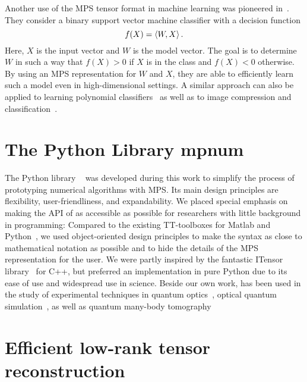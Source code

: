 Another use of the MPS tensor format in machine learning was pioneered in~\cite{Stoudenmire_2016_Supervised}.
They consider a binary support vector machine classifier with a decision function
\[
  f(X) = \braket{W, X}.
\]
Here, $X$ is the input vector and $W$ is the model vector.
The goal is to determine $W$ in such a way that $f(X) > 0$ if $X$ is in the  class and $f(X) < 0$ otherwise.
By using an MPS representation for $W$ and $X$, they are able to efficiently learn such a model even in high-dimensional settings.
A similar approach can also be applied to learning polynomial classifiers~\cite{Chen_2017_Parallelized} as well as to image compression and classification~\cite{Bengua_2015_Optimal,Bengua_2016_Matrix}.



\section{The Python Library mpnum}%
\label{sec:tensors.mpnum}

The Python library \mpnum~\cite{Suess_2017_Mpnum} was developed during this work to simplify the process of prototyping numerical algorithms with MPS.
Its main design principles are flexibility, user-friendliness, and expandability.
We placed special emphasis on making the API of \mpnum{} as accessible as possible for researchers with little background in programming:
Compared to the existing TT-toolboxes for Matlab and Python~\cite{Oseledets_2018_Git,Oseledets_2018_Ttpy}, we used object-oriented design principles to make the syntax as close to mathematical notation as possible and to hide the details of the MPS representation for the user.
We were partly inspired by the fantastic ITensor library~\cite{Stoudenmire_2018_Itensor} for C++, but preferred an implementation in pure Python due to its ease of use and widespread use in science.
Beside our own work, \mpnum{} has been used in the study of experimental techniques in quantum optics~\cite{Scheuer_2017_Robust,Schwartz_2017_Pulsed}, optical quantum simulation~\cite{Dhand_2017_Proposal}, as well as quantum many-body tomography~\cite{Lanyon_2017_Efficient}





\section{Efficient low-rank tensor reconstruction}%
\label{sec:tensors.als}

